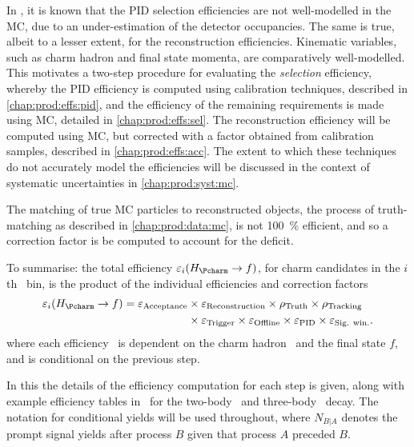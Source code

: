 In \lhcb, it is known that the \ac{PID} selection efficiencies are not 
well-modelled in the \ac{MC}, due to an under-estimation of the detector 
occupancies.
The same is true, albeit to a lesser extent, for the reconstruction 
efficiencies.
Kinematic variables, such as charm hadron and final state momenta, are 
comparatively well-modelled.
This motivates a two-step procedure for evaluating the \emph{selection} 
efficiency, whereby the \ac{PID} efficiency is computed using calibration 
techniques, described in \cref{chap:prod:effs:pid}, and the efficiency of the remaining 
requirements is made using \ac{MC}, detailed in \cref{chap:prod:effs:sel}.
The reconstruction efficiency will be computed using \ac{MC}, but corrected 
with a factor obtained from calibration samples, described in \cref{chap:prod:effs:acc}.
The extent to which these techniques do not accurately model the efficiencies 
will be discussed in the context of systematic uncertainties in 
\cref{chap:prod:syst:mc}.

The matching of true \ac{MC} particles to reconstructed objects, the process of 
truth-matching as described in \cref{chap:prod:data:mc}, is not \SI{100}{\%} 
efficient, and so a correction factor \efftruth is be computed to account for 
the deficit.

To summarise: the total efficiency $\eff_{i}(\decay{\PHc}{f})$, for charm candidates in the $i$th \pTy\ bin, is 
the product of the individual efficiencies and correction factors
\begin{align}
  \eff_{i}(\decay{\PHc}{f}) = \effacc &\times \effreco \times \efftruth \times \efftracking \nonumber\\
                                      &\times \efftrig \times \effoffline \times \effpid \times \effsigwin.
  \label{eqn:prod:effs:total_eff}
\end{align}
where each efficiency \eff\ is dependent on the charm hadron \PHc\ and the 
final state $f$, and is conditional on the previous step.

In this  the details of the efficiency computation for each step is 
given, along with example efficiency tables in \pTy\ for the two-body \DzToKpi\ 
and three-body \DpToKpipi\ decay.
The notation for conditional yields will be used throughout, where $N_{B|A}$ 
denotes the prompt signal yields after process $B$ given that process $A$ 
preceded $B$.

